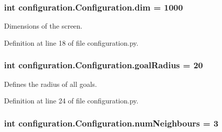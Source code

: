 \hypertarget{classconfiguration_1_1Configuration_af63a65a65716f36cb11afd4d0e7f318f}{
\subsubsection[{dim}]{\setlength{\rightskip}{0pt plus 5cm}int configuration.\-Configuration.\-dim = 1000\hspace{0.3cm}{\ttfamily [static]}}}\label{classconfiguration_1_1Configuration_af63a65a65716f36cb11afd4d0e7f318f}


Dimensions of the screen. 



Definition at line 18 of file configuration.\-py.

\hypertarget{classconfiguration_1_1Configuration_a1a5fee18f20950a467d1b94d4d276c78}{
\subsubsection[{goal\-Radius}]{\setlength{\rightskip}{0pt plus 5cm}int configuration.\-Configuration.\-goal\-Radius = 20\hspace{0.3cm}{\ttfamily [static]}}}\label{classconfiguration_1_1Configuration_a1a5fee18f20950a467d1b94d4d276c78}


Defines the radius of all goals. 



Definition at line 24 of file configuration.\-py.

\hypertarget{classconfiguration_1_1Configuration_a7eef6f8f2eb6d4a8fa4a45ddf9f6e1ba}{
\subsubsection[{num\-Neighbours}]{\setlength{\rightskip}{0pt plus 5cm}int configuration.\-Configuration.\-num\-Neighbours = 3\hspace{0.3cm}{\ttfamily [static]}}}\label{classconfiguration_1_1Configuration_a7eef6f8f2eb6d4a8fa4a45ddf9f6e1ba}



